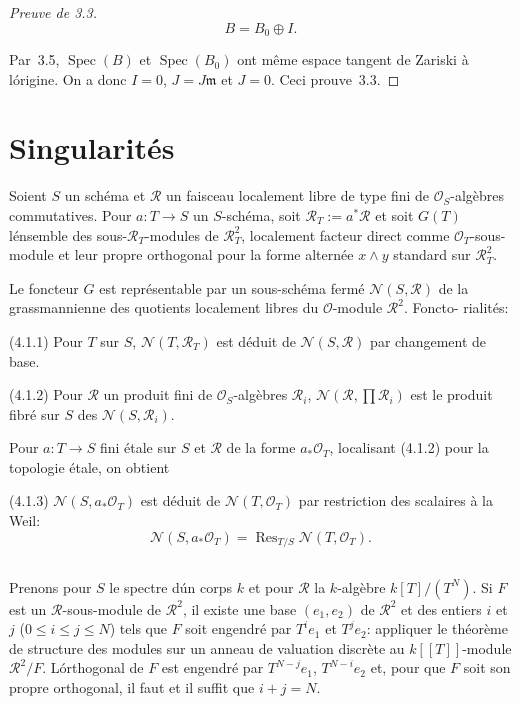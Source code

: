 \documentclass[11pt,a4paper]{article}
\theoremstyle{plain}
\theoremstyle{definition}
\DeclareMathOperator{\Spec}{Spec}
\DeclareMathOperator{\Res}{Res}
\begin{document}
\begin{proof}[Preuve de 3.3]
\begin{equation}
B = B_0 \oplus I.
\end{equation}

Par~3.5, $\Spec(B)$ et $\Spec(B_0)$ ont m\^eme espace tangent de Zariski \`a l\'origine. On
a donc $I = 0$, $J = J\mathfrak{m}$ et $J = 0$. Ceci prouve~3.3.
\end{proof}

\section{Singularit\'es}

Soient $S$ un sch\'ema et $\mathscr{R}$ un faisceau localement libre de type fini de $\mathscr{O}_S$-alg\`ebres
commutatives. Pour $a: T \to S$ un $S$-sch\'ema, soit $\mathscr{R}_T := a^*\mathscr{R}$ et soit $G(T)$
l\'ensemble des sous-$\mathscr{R}_T$-modules de $\mathscr{R}_T^2$, localement facteur direct comme
$\mathscr{O}_T$-sous-module et leur propre orthogonal pour la forme altern\'ee $x \wedge y$
standard sur $\mathscr{R}_T^2$.

Le foncteur $G$ est repr\'esentable par un sous-sch\'ema ferm\'e $\mathscr{N}(S, \mathscr{R})$ de la
grassmannienne des quotients localement libres du $\mathscr{O}$-module $\mathscr{R}^2$. Foncto-
rialit\'es:

(4.1.1) Pour $T$ sur $S$, $\mathscr{N}(T, \mathscr{R}_T)$ est d\'eduit de $\mathscr{N}(S, \mathscr{R})$ par changement de base.

(4.1.2) Pour $\mathscr{R}$ un produit fini de $\mathscr{O}_S$-alg\`ebres $\mathscr{R}_i$, $\mathscr{N}(\mathscr{R}, \prod \mathscr{R}_i)$ est le produit fibr\'e
sur $S$ des $\mathscr{N}(S, \mathscr{R}_i)$.

Pour $a: T \to S$ fini \'etale sur $S$ et $\mathscr{R}$ de la forme $a_*\mathscr{O}_T$, localisant (4.1.2) pour
la topologie \'etale, on obtient

(4.1.3) $\mathscr{N}(S, a_*\mathscr{O}_T)$ est d\'eduit de $\mathscr{N}(T, \mathscr{O}_T)$ par restriction des scalaires \`a la
Weil:
\begin{equation}
\mathscr{N}(S, a_*\mathscr{O}_T) = \Res_{T/S} \mathscr{N}(T, \mathscr{O}_T).
\end{equation}

\subsection{}

Prenons pour $S$ le spectre d\'un corps $k$ et pour $\mathscr{R}$ la $k$-alg\`ebre $k[T]/(T^N)$. Si
$F$ est un $\mathscr{R}$-sous-module de $\mathscr{R}^2$, il existe une base $(e_1, e_2)$ de $\mathscr{R}^2$ et des entiers $i$
et $j$ ($0 \leq i \leq j \leq N$) tels que $F$ soit engendr\'e par $T^i e_1$ et $T^j e_2$: appliquer le
th\'eor\`eme de structure des modules sur un anneau de valuation discr\`ete au
$k[[T]]$-module $\mathscr{R}^2/F$. L\'orthogonal de $F$ est engendr\'e par $T^{N-j} e_1$, $T^{N-i} e_2$ et,
pour que $F$ soit son propre orthogonal, il faut et il suffit que $i + j = N$.
\end{document}
